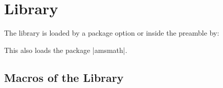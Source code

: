 \clearpage
\section{Library }\label{sec:theorems}%
%
The library is loaded by a package option or inside the preamble by:
\begin{dispListing}
\end{dispListing}
This also loads the package |amsmath|.

\subsection{Macros of the Library}

